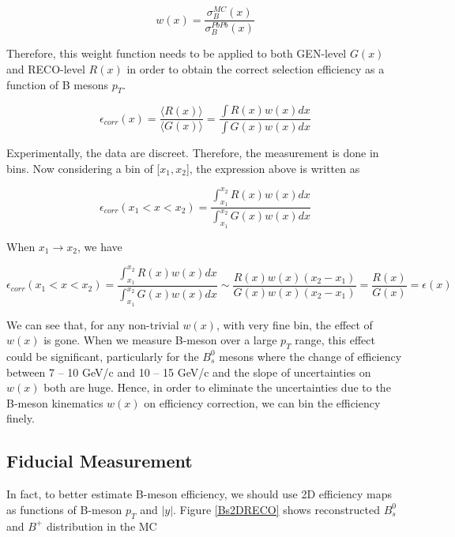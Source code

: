 \begin{equation}
w(x) = \frac{\sigma^{MC}_B (x)}{\sigma^{PbPb}_B (x)}
\end{equation}

Therefore, this weight function needs to be applied to both GEN-level $G(x)$ and RECO-level $R(x)$ in order to obtain the correct selection efficiency as a function of B mesons $p_T$. 


\begin{equation}
\epsilon_{corr}(x) =  \frac{\langle R(x) \rangle}{\langle G(x) \rangle}= \frac{\int R(x) w(x)dx}{\int G(x) w(x)dx}
\end{equation}

Experimentally, the data are discreet. Therefore, the measurement is done in bins. Now considering a bin of [$x_1,x_2$], the expression above is written as 

\begin{equation}
\epsilon_{corr}(x_1 < x < x_2) =  \frac{\int^{x_2}_{x_1} R(x) w(x)dx}{\int^{x_2}_{x_1} G(x) w(x)dx}
\end{equation}


When $x_1 \rightarrow x_2$, we have

\begin{equation}
\epsilon_{corr}(x_1 < x < x_2) =  \frac{\int^{x_2}_{x_1} R(x) w(x)dx}{\int^{x_2}_{x_1} G(x) w(x)dx} \sim  \frac{R(x) w(x)  (x_2 - x_1)}{G(x) w(x) (x_2 - x_1)}  = \frac{R(x)}{G(x)} = \epsilon(x)
\end{equation}

We can see that, for any non-trivial $w(x)$, with very fine bin, the effect of $w(x)$ is gone. When we measure B-meson over a large $p_T$ range, this effect could be significant, particularly for the $B^0_s$ mesons where the change of efficiency between 7 -- 10 GeV/c and 10 -- 15 GeV/c and the slope of uncertainties on $w(x)$ both are huge. Hence, in order to eliminate the uncertainties due to the B-meson kinematics $w(x)$ on efficiency correction, we can bin the efficiency finely.

\subsection{Fiducial Measurement}

In fact, to better estimate B-meson efficiency, we should use 2D efficiency maps as functions of B-meson $p_T$ and $|y|$. Figure \ref{Bs2DRECO} shows reconstructed $B^0_s$ and $B^+$ distribution in the MC

